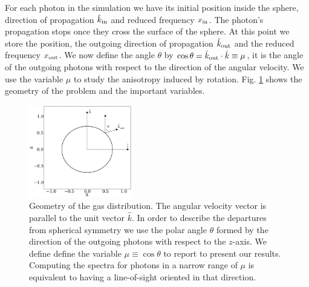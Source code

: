 \documentclass{emulateapj}
\begin{document}
For each photon in the simulation we have its initial position inside
the sphere, direction of propagation $\hat{k}_{\rm in}$ and reduced
frequency $x_{\rm in}$. 
The photon's propagation stops once they cross the
surface of the sphere. At this point we store the position, the outgoing direction
of propagation $\hat{k}_{\rm out}$ and the reduced frequency $x_{\rm
  out}$. We now define the angle $\theta$ by $\cos\theta = \hat{k}_{\rm out}\cdot
\hat{k}\equiv \mu$, it is the angle of the outgoing photons with 
respect to the direction of the angular velocity. We use the variable $\mu$ to
study the anisotropy induced by rotation. Fig. \ref{fig:geometry}
shows the geometry of the problem and the important variables.




\begin{figure}
\begin{center}
  \includegraphics[width=0.4\textwidth]{f1.pdf}
\end{center}
\caption{Geometry of the gas distribution. The angular velocity vector
  is parallel to the unit vector $\hat{k}$. In order to describe the
  departures from spherical symmetry we use the polar angle $\theta$
  formed by the direction of the outgoing photons with respect to the
  $z$-axis. We define define the variable $\mu\equiv\cos\theta$ to
  report to present our results. Computing the spectra for photons in
  a   narrow range of $\mu$ is equivalent to having a line-of-sight
  oriented in that direction.  
    \label{fig:geometry}}  
\end{figure}
\end{document}
